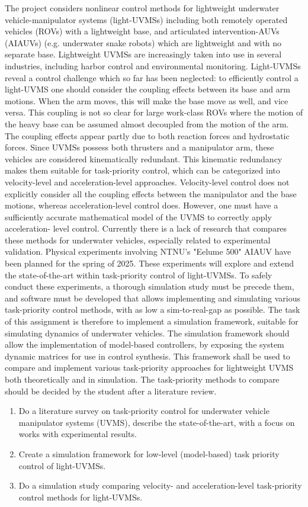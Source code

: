 The project considers nonlinear control methods for lightweight underwater vehicle-manipulator
systems (light-UVMSs) including both remotely operated vehicles (ROVs) with a lightweight
base, and articulated intervention-AUVs (AIAUVs) (e.g. underwater snake robots) which are
lightweight and with no separate base. Lightweight UVMSs are increasingly taken into use in
several industries, including harbor control and environmental monitoring.
Light-UVMSs reveal a control challenge which so far has been neglected: to efficiently
control a light-UVMS one should consider the coupling effects between its base and arm
motions. When the arm moves, this will make the base move as well, and vice versa. This
coupling is not so clear for large work-class ROVs where the motion of the heavy base can be
assumed almost decoupled from the motion of the arm. The coupling effects appear partly due
to both reaction forces and hydrostatic forces.
Since UVMSs possess both thrusters and a manipulator arm, these vehicles are considered
kinematically redundant. This kinematic redundancy makes them suitable for task-priority control, 
which can be categorized into velocity-level and acceleration-level approaches. Velocity-level 
control does not explicitly consider all the coupling effects between the
manipulator and the base motions, whereas acceleration-level control does. However, one must
have a sufficiently accurate mathematical model of the UVMS to correctly apply acceleration-
level control. Currently there is a lack of research that compares these methods for underwater
vehicles, especially related to experimental validation.
Physical experiments involving NTNU's "Eelume 500" AIAUV have been planned for the spring of 2025. These experiments will explore and extend the state-of-the-art within task-priority control of light-UVMSs. To safely conduct these experiments, a thorough simulation study must be precede them, and software must be developed that allows implementing and simulating various task-priority control methods, with as low a sim-to-real-gap as possible. The task of this assignment is therefore to implement a simulation framework, suitable for simulating dynamics of underwater vehicles. The simulation framework should allow the implementation of model-based controllers, by exposing the system dynamic matrices for use in control synthesis. This framework shall be used to compare and implement various task-priority approaches for lightweight UVMS both theoretically and in simulation. The task-priority methods to compare should be decided by the student after a literature review.
\begin{enumerate}
\item Do a literature survey on task-priority control for underwater vehicle manipulator
systems (UVMS), describe the state-of-the-art, with a focus on works with experimental
results.
\item Create a simulation framework for low-level (model-based) task priority control of light-UVMSs.
\item Do a simulation study comparing velocity- and acceleration-level task-priority control
methods for light-UVMSs.
\end{enumerate}
\newpage
